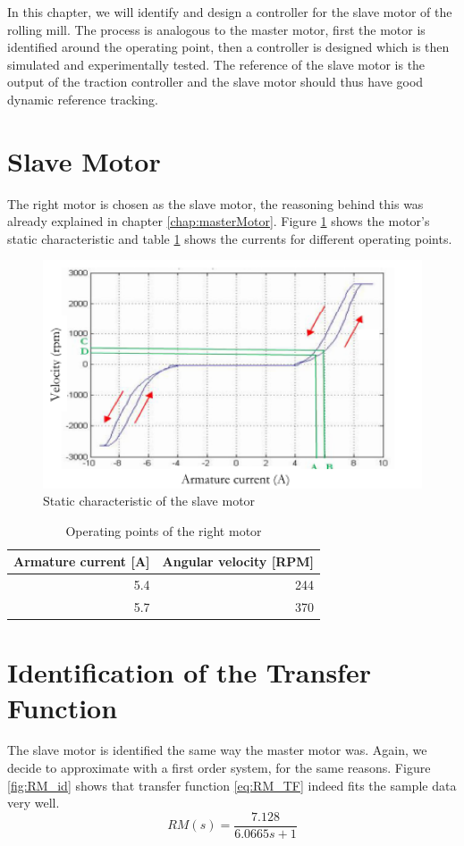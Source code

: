 In this chapter, we will identify and design a controller for the slave motor of the rolling mill. The process is analogous to the master motor, first the motor is identified around the operating point, then a controller is designed which is then simulated and experimentally tested. The reference of the slave motor is the output of the traction controller and the slave motor should thus have good dynamic reference tracking.

\section{Slave Motor}
The right motor is chosen as the slave motor, the reasoning behind this was already explained in chapter \ref{chap:masterMotor}. Figure \ref{fig:RM_RPM_curr} shows the motor's static characteristic and table \ref{tab:RM_operating_region} shows the currents for different operating points.

\begin{figure}[htbp]
\centering
\includegraphics[width = .7\textwidth]{pics/RM_RPM_Current.png}
\caption{Static characteristic of the slave motor}
\label{fig:RM_RPM_curr}
\end{figure}

\begin{table}[H]
	\centering
		\begin{tabular}{rr}
        \toprule
			Armature current [A] & Angular velocity [RPM] \\ \midrule
            5.4 & 244 \\
            5.7 & 370 \\\bottomrule
		\end{tabular}
	\caption{Operating points of the right motor}
	\label{tab:RM_operating_region}
\end{table}

\FloatBarrier

\section{Identification of the Transfer Function}
The slave motor is identified the same way the master motor was. Again, we decide to approximate with a first order system, for the same reasons. Figure \ref{fig:RM_id} shows that transfer function \ref{eq:RM_TF} indeed fits the sample data very well.
\begin{equation}
	RM(s) = \frac{7.128}{6.0665s+1}
    \label{eq:RM_TF}
\end{equation}

